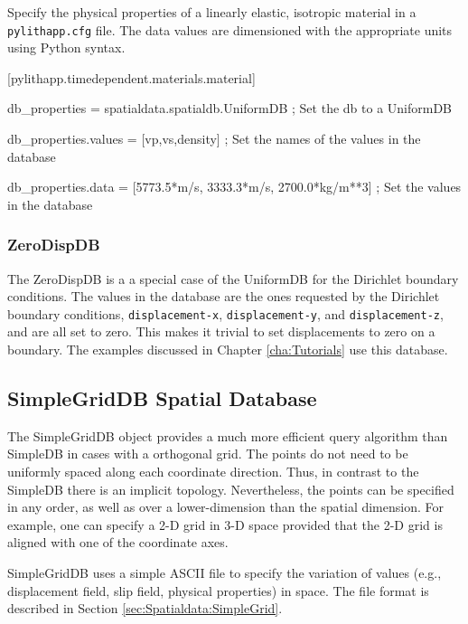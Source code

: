 Specify the physical properties of a linearly elastic, isotropic material
in a \texttt{pylithapp.cfg} file. The data values are dimensioned
with the appropriate units using Python syntax.
\begin{lyxcode}
{\footnotesize{}{[}pylithapp.timedependent.materials.material{]}}{\footnotesize \par}

{\footnotesize{}db\_properties = spatialdata.spatialdb.UniformDB ; Set the db to a UniformDB}{\footnotesize \par}

{\footnotesize{}db\_properties.values = {[}vp,vs,density{]} ; Set the names of the values in the database}{\footnotesize \par}

{\footnotesize{}db\_properties.data = {[}5773.5{*}m/s, 3333.3{*}m/s, 2700.0{*}kg/m{*}{*}3{]} ; Set the values in the database}{\footnotesize \par}
\end{lyxcode}

\subsubsection{ZeroDispDB}

The ZeroDispDB is a a special case of the UniformDB for the Dirichlet
boundary conditions. The values in the database are the ones requested
by the Dirichlet boundary conditions, \texttt{displacement-x}, \texttt{displacement-y},
and \texttt{displacement-z}, and are all set to zero. This makes it
trivial to set displacements to zero on a boundary. The examples discussed
in Chapter \vref{cha:Tutorials} use this database.


\subsection{SimpleGridDB Spatial Database}

The SimpleGridDB object provides a much more efficient query algorithm
than SimpleDB in cases with a orthogonal grid. The points do not need
to be uniformly spaced along each coordinate direction. Thus, in contrast
to the SimpleDB there is an implicit topology. Nevertheless, the points
can be specified in any order, as well as over a lower-dimension than
the spatial dimension. For example, one can specify a 2-D grid in
3-D space provided that the 2-D grid is aligned with one of the coordinate
axes. 

SimpleGridDB uses a simple ASCII file to specify the variation of
values (e.g., displacement field, slip field, physical properties)
in space. The file format is described in Section \vref{sec:Spatialdata:SimpleGrid}. 

